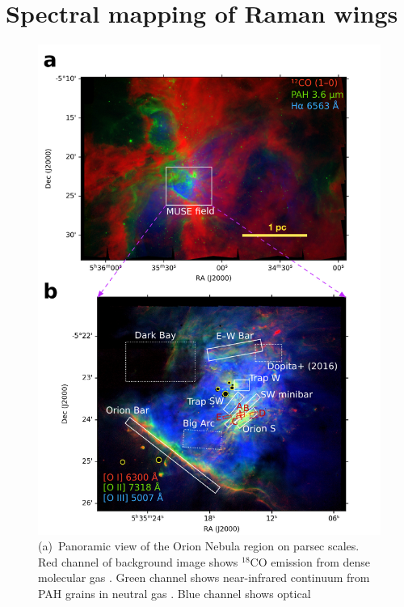 \documentclass[useAMS, usenatbib, a4paper]{mnras}
\newcommand*\chem[1]{\ensuremath{\mathrm{#1}}}
\begin{document}
\section{Spectral mapping of Raman wings}
\label{sec:muse-spectr-mapp}
\begin{figure}
  \centering
  \includegraphics[width=\linewidth]{figs/raman-fov-regions}
  \caption{(a)~Panoramic view of the Orion Nebula region on parsec
    scales.  Red channel of background image shows \chem{^{18}CO}
    emission from dense molecular gas \citetext{Carma-NRO Orion
      Survey, \citealp{Kong:2018a}}. Green channel shows near-infrared
    continuum from PAH grains in neutral gas \citetext{Spitzer Orion
      Survey, \citealp{Megeath:2012a}}.  Blue channel shows optical
}
\end{figure}
\end{document}

